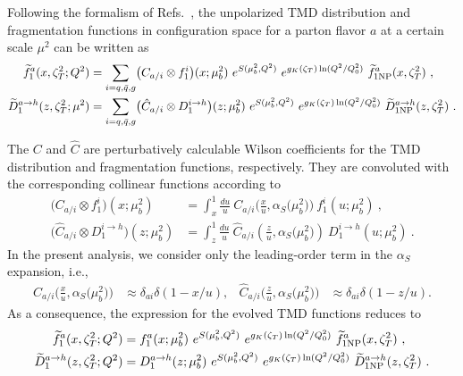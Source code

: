 \documentclass[aps,preprintnumbers,showpacs,nofootinbib,superscriptaddress,floatfix]{revtex4}
\newcommand{\bT}{\zeta_T}
\begin{document}
Following the formalism of Refs.~\cite{Collins:2011zzd,Aybat:2011zv}, the
unpolarized TMD distribution and fragmentation functions in configuration
space for a parton flavor $a$ at a certain scale $\mu^2$ can be written as 
\begin{align}   
\widetilde{f}_1^a (x,  \bT^2; Q^2) &= \sum_{i=q,\bar q,g} \bigl( C_{a/i} \otimes f_1^i \bigr) (x; \mu_b^2) 
\  e^{S (\mu_b^2, Q^2)} \  e^{g_K(\bT) \ln (Q^2 / Q_0^2)} \  \widetilde{f}_{1 {\rm NP}}^a (x, \bT^2) \ ,
\label{e:TMDevol1} \\
\widetilde{D}_1^{a\to h} (z, \bT^2; \mu^2) &= \sum_{i=q,\bar q,g} \bigl( \hat{C}_{a/i} \otimes D_1^{i\to h} \bigr) (z; \mu_b^2) \  e^{S (\mu_b^2, Q^2)} \  e^{g_K( \bT) \ln (Q^2 / Q_0^2)} \  \widetilde{D}_{1 {\rm NP}}^{a\to h} (z, \bT^2) \  .
\label{e:TMDevol2}
\end{align}

The $C$ and $\hat{C}$ are perturbatively calculable Wilson coefficients for
the TMD distribution and fragmentation functions, respectively. They are
convoluted with the corresponding collinear functions according to 
\begin{align}
\bigl( C_{a/i} \otimes f_1^i \bigr) (x; \mu_b^2) &=
  \int_x^1 \frac{du}{u}\  
        C_{a/i} \Big( \frac{x}{u}, \alpha_S\big(\mu_b^2\big)  \Big) \  
        f_1^i (u; \mu_b^2) \  , 
\label{e:WC1} \\
\bigl( \hat{C}_{a/i} \otimes D_1^{i\to h} \bigr) (z; \mu_b^2) &= \int_z^1 \frac{du}{u}\  \hat{C}_{a/i} \left( \frac{z}{u}, \alpha_S\big(\mu_b^2\big) \right) \  D_1^{i\to h} (u; \mu_b^2) \  . 
\label{e:WC2}
\end{align}
In the present analysis, we consider only the leading-order term
in the $\alpha_S$ expansion, i.e., 
\begin{align} 
C_{a/i} \Big( \frac{x}{u}, \alpha_S\big(\mu_b^2\big)  \Big) &\approx
\delta_{ai} \delta(1-x/u),
&
\hat{C}_{a/i} \Big( \frac{z}{u}, \alpha_S\big(\mu_b^2\big)  \Big) &\approx
\delta_{ai} \delta(1-z/u).
\end{align}  
As a consequence, the expression for the evolved TMD functions reduces to
\begin{align}   
\widetilde{f}_1^a (x,  \bT^2; Q^2) &= f_1^a (x ; \mu_b^2) 
\  e^{S (\mu_b^2, Q^2)} \  e^{g_K(\bT) \ln (Q^2 / Q_0^2)} \  \widetilde{f}_{1 {\rm NP}}^a (x, \bT^2) \ ,
\label{e:TMDevol1b} \\
\widetilde{D}_1^{a\to h} (z, \bT^2; Q^2) &= D_1^{a\to h} (z; \mu_b^2) \  e^{S (\mu_b^2, Q^2)} \  e^{g_K( \bT) \ln (Q^2 / Q_0^2)} \  \widetilde{D}_{1 {\rm NP}}^{a\to h} (z, \bT^2) \  .
\label{e:TMDevol2b}
\end{align}
\end{document}
